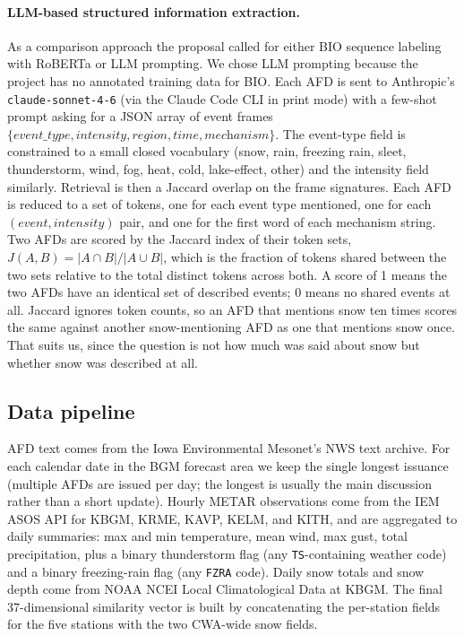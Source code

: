 \documentclass[11pt]{article}
\begin{document}
\paragraph{LLM-based structured information extraction.}
As a comparison approach the proposal called for either BIO sequence labeling with RoBERTa or LLM prompting. We chose LLM prompting because the project has no annotated training data for BIO. Each AFD is sent to Anthropic's \texttt{claude-sonnet-4-6} (via the Claude Code CLI in print mode) with a few-shot prompt asking for a JSON array of event frames \(\{\textit{event\_type}, \textit{intensity}, \textit{region}, \textit{time}, \textit{mechanism}\}\). The event-type field is constrained to a small closed vocabulary (snow, rain, freezing rain, sleet, thunderstorm, wind, fog, heat, cold, lake-effect, other) and the intensity field similarly. Retrieval is then a Jaccard overlap on the frame signatures. Each AFD is reduced to a set of tokens, one for each event type mentioned, one for each \((\textit{event}, \textit{intensity})\) pair, and one for the first word of each mechanism string. Two AFDs are scored by the Jaccard index of their token sets, \(J(A, B) = |A \cap B| / |A \cup B|\), which is the fraction of tokens shared between the two sets relative to the total distinct tokens across both. A score of 1 means the two AFDs have an identical set of described events; 0 means no shared events at all. Jaccard ignores token counts, so an AFD that mentions snow ten times scores the same against another snow-mentioning AFD as one that mentions snow once. That suits us, since the question is not how much was said about snow but whether snow was described at all.

\subsection{Data pipeline}
AFD text comes from the Iowa Environmental Mesonet's NWS text archive. For each calendar date in the BGM forecast area we keep the single longest issuance (multiple AFDs are issued per day; the longest is usually the main discussion rather than a short update). Hourly METAR observations come from the IEM ASOS API for KBGM, KRME, KAVP, KELM, and KITH, and are aggregated to daily summaries: max and min temperature, mean wind, max gust, total precipitation, plus a binary thunderstorm flag (any \texttt{TS}-containing weather code) and a binary freezing-rain flag (any \texttt{FZRA} code). Daily snow totals and snow depth come from NOAA NCEI Local Climatological Data at KBGM. The final 37-dimensional similarity vector is built by concatenating the per-station fields for the five stations with the two CWA-wide snow fields.
\end{document}
